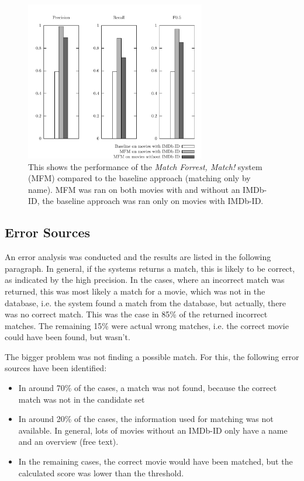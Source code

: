 \begin{figure}[h!]
  \begin{center}
  \includegraphics[width=0.7\textwidth]{images/baseline.pdf}
  \end{center}
  \caption{This shows the performance of the \emph{Match Forrest, Match!} system (MFM) compared to the baseline approach (matching only by name). MFM was ran on both movies with and without an IMDb-ID, the baseline approach was ran only on movies with IMDb-ID.}
  \label{fig_baseline}
\end{figure}

\subsection{Error Sources}
An error analysis was conducted and the results are listed in the following paragraph.
In general, if the systems returns a match, this is likely to be correct, as indicated by the high precision.
In the cases, where an incorrect match was returned, this was most likely a match for a movie, which was not in the database, i.e. the system found a match from the database, but actually, there was no correct match.
This was the case in 85\% of the returned incorrect matches.
The remaining 15\% were actual wrong matches, i.e. the correct movie could have been found, but wasn't.

The bigger problem was not finding a possible match.
For this, the following error sources have been identified:

\begin{itemize}
	\item
    In around 70\% of the cases, a match was not found, because the correct match was not in the candidate set
	\item
    In around 20\% of the cases, the information used for matching was not available.
    In general, lots of movies without an IMDb-ID only have a name and an overview (free text).
	\item
    In the remaining cases, the correct movie would have been matched, but the calculated score was lower than the threshold.
\end{itemize}
